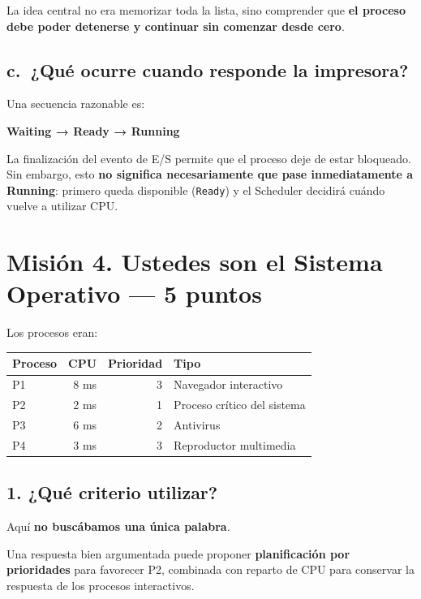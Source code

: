 \documentclass[
  spanish,
  letterpaper,
]{scrbook}
\newcounter{none} %
\begin{document}
La idea central no era memorizar toda la lista, sino comprender que
\textbf{el proceso debe poder detenerse y continuar sin comenzar desde
cero}.

\section{c.~¿Qué ocurre cuando responde la
impresora?}\label{c.-quuxe9-ocurre-cuando-responde-la-impresora}

Una secuencia razonable es:

\textbf{Waiting → Ready → Running}

La finalización del evento de E/S permite que el proceso deje de estar
bloqueado. Sin embargo, esto \textbf{no significa necesariamente que
pase inmediatamente a Running}: primero queda disponible
(\texttt{Ready}) y el Scheduler decidirá cuándo vuelve a utilizar CPU.


\chapter{Misión 4. Ustedes son el Sistema Operativo --- 5
puntos}\label{misiuxf3n-4.-ustedes-son-el-sistema-operativo-5-puntos-1}

Los procesos eran:

{\def\LTcaptype{none} %
\begin{longtable}[]{@{}lrrl@{}}
\toprule\noalign{}
Proceso & CPU & Prioridad & Tipo \\
\midrule\noalign{}
\endhead
\bottomrule\noalign{}
\endlastfoot
P1 & 8 ms & 3 & Navegador interactivo \\
P2 & 2 ms & 1 & Proceso crítico del sistema \\
P3 & 6 ms & 2 & Antivirus \\
P4 & 3 ms & 3 & Reproductor multimedia \\
\end{longtable}
}

\section{1. ¿Qué criterio utilizar?}\label{quuxe9-criterio-utilizar}

Aquí \textbf{no buscábamos una única palabra}.

Una respuesta bien argumentada puede proponer \textbf{planificación por
prioridades} para favorecer P2, combinada con reparto de CPU para
conservar la respuesta de los procesos interactivos.
\end{document}
